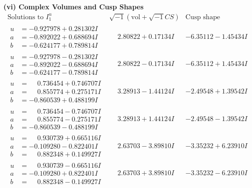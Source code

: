 \documentclass[1p]{elsarticle_modified}
\theoremstyle{definition}
\newcommand{\I}{\sqrt{-1}}
\begin{document}
\newpage\flushleft \textbf{(vi) Complex Volumes and Cusp Shapes}
$$\begin{array}{c|c|c}  
\text{Solutions to }I^u_{1}& \I (\text{vol} + \sqrt{-1}CS) & \text{Cusp shape}\\
 \hline 
\begin{aligned}
u &= -0.927978 + 0.281302 I \\
a &= -0.892022 + 0.688694 I \\
b &= -0.624177 + 0.789814 I\end{aligned}
 & \phantom{-}2.80822 + 0.17134 I & -6.35112 - 1.45434 I \\ \hline\begin{aligned}
u &= -0.927978 - 0.281302 I \\
a &= -0.892022 - 0.688694 I \\
b &= -0.624177 - 0.789814 I\end{aligned}
 & \phantom{-}2.80822 - 0.17134 I & -6.35112 + 1.45434 I \\ \hline\begin{aligned}
u &= \phantom{-}0.736454 + 0.746707 I \\
a &= \phantom{-}0.855774 + 0.275171 I \\
b &= -0.860539 + 0.488199 I\end{aligned}
 & \phantom{-}3.28913 - 1.44124 I & -2.49548 + 1.39542 I \\ \hline\begin{aligned}
u &= \phantom{-}0.736454 - 0.746707 I \\
a &= \phantom{-}0.855774 - 0.275171 I \\
b &= -0.860539 - 0.488199 I\end{aligned}
 & \phantom{-}3.28913 + 1.44124 I & -2.49548 - 1.39542 I \\ \hline\begin{aligned}
u &= \phantom{-}0.930739 + 0.665116 I \\
a &= -0.109280 - 0.822401 I \\
b &= \phantom{-}0.882348 + 0.149927 I\end{aligned}
 & \phantom{-}2.63703 - 3.89810 I & -3.35232 + 6.23910 I \\ \hline\begin{aligned}
u &= \phantom{-}0.930739 - 0.665116 I \\
a &= -0.109280 + 0.822401 I \\
b &= \phantom{-}0.882348 - 0.149927 I\end{aligned}
 & \phantom{-}2.63703 + 3.89810 I & -3.35232 - 6.23910 I \\ \hline\begin{aligned}

\end{aligned}
\end{array}$$
\end{document}
